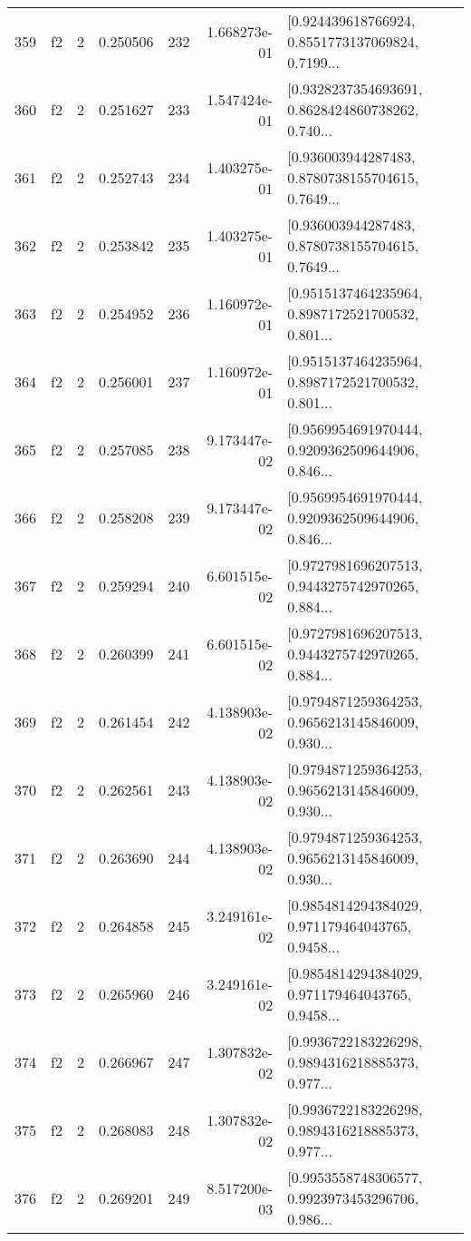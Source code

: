 \begin{tabular}{lllrlrl}
359 &  f2 &   2 &  0.250506 &  232 &  1.668273e-01 &  [0.924439618766924, 0.8551773137069824, 0.7199... \\
360 &  f2 &   2 &  0.251627 &  233 &  1.547424e-01 &  [0.9328237354693691, 0.8628424860738262, 0.740... \\
361 &  f2 &   2 &  0.252743 &  234 &  1.403275e-01 &  [0.936003944287483, 0.8780738155704615, 0.7649... \\
362 &  f2 &   2 &  0.253842 &  235 &  1.403275e-01 &  [0.936003944287483, 0.8780738155704615, 0.7649... \\
363 &  f2 &   2 &  0.254952 &  236 &  1.160972e-01 &  [0.9515137464235964, 0.8987172521700532, 0.801... \\
364 &  f2 &   2 &  0.256001 &  237 &  1.160972e-01 &  [0.9515137464235964, 0.8987172521700532, 0.801... \\
365 &  f2 &   2 &  0.257085 &  238 &  9.173447e-02 &  [0.9569954691970444, 0.9209362509644906, 0.846... \\
366 &  f2 &   2 &  0.258208 &  239 &  9.173447e-02 &  [0.9569954691970444, 0.9209362509644906, 0.846... \\
367 &  f2 &   2 &  0.259294 &  240 &  6.601515e-02 &  [0.9727981696207513, 0.9443275742970265, 0.884... \\
368 &  f2 &   2 &  0.260399 &  241 &  6.601515e-02 &  [0.9727981696207513, 0.9443275742970265, 0.884... \\
369 &  f2 &   2 &  0.261454 &  242 &  4.138903e-02 &  [0.9794871259364253, 0.9656213145846009, 0.930... \\
370 &  f2 &   2 &  0.262561 &  243 &  4.138903e-02 &  [0.9794871259364253, 0.9656213145846009, 0.930... \\
371 &  f2 &   2 &  0.263690 &  244 &  4.138903e-02 &  [0.9794871259364253, 0.9656213145846009, 0.930... \\
372 &  f2 &   2 &  0.264858 &  245 &  3.249161e-02 &  [0.9854814294384029, 0.971179464043765, 0.9458... \\
373 &  f2 &   2 &  0.265960 &  246 &  3.249161e-02 &  [0.9854814294384029, 0.971179464043765, 0.9458... \\
374 &  f2 &   2 &  0.266967 &  247 &  1.307832e-02 &  [0.9936722183226298, 0.9894316218885373, 0.977... \\
375 &  f2 &   2 &  0.268083 &  248 &  1.307832e-02 &  [0.9936722183226298, 0.9894316218885373, 0.977... \\
376 &  f2 &   2 &  0.269201 &  249 &  8.517200e-03 &  [0.9953558748306577, 0.9923973453296706, 0.986... \\

\end{tabular}
